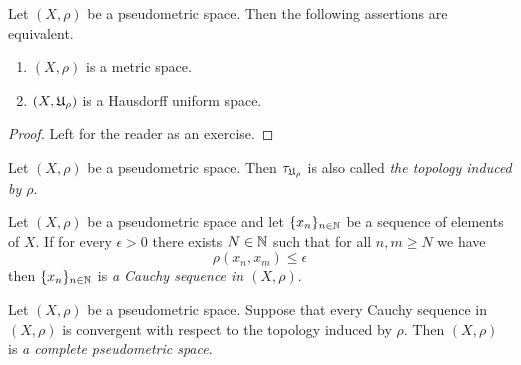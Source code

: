 \begin{fact}\label{fact:metric_spaces_induce_Hausdorff_uniform_structures}
Let $(X,\rho)$ be a pseudometric space. Then the following assertions are equivalent.
\begin{enumerate}[label=\emph{\textbf{(\roman*)}}, leftmargin=*]
\item $(X,\rho)$ is a metric space.
\item $\left(X,{\mathfrak U}_{\rho}\right)$ is a Hausdorff uniform space.
\end{enumerate}
\end{fact}
\begin{proof}
Left for the reader as an exercise.
\end{proof}

\begin{definition}
Let $(X,\rho)$ be a pseudometric space. Then $\tau_{{\mathfrak U}_{\rho}}$ is also called \textit{the topology induced by $\rho$}.
\end{definition}

\begin{definition}
Let $(X,\rho)$ be a pseudometric space and let $\{x_n\}_{n\in {\mathbb N}}$ be a sequence of elements of $X$. If for every $\epsilon > 0$ there exists $N\in {\mathbb N}$ such that for all $n,m\geq N$ we have
$$\rho(x_n,x_m) \leq \epsilon$$
then $\{x_n\}_{n\in {\mathbb N}}$ is \textit{a Cauchy sequence in $(X,\rho)$}.
\end{definition}

\begin{definition}
Let $(X,\rho)$ be a pseudometric space. Suppose that every Cauchy sequence in $(X,\rho)$ is convergent with respect to the topology induced by $\rho$. Then $(X,\rho)$ is \textit{a complete pseudometric space}. 
\end{definition}

